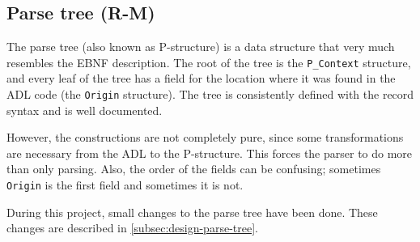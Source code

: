 
\subsection{Parse tree (R-M)}
\label{subsec:analysis-parse-tree}
The parse tree (also known as P-structure) is a data structure that very much resembles the EBNF description.
The root of the tree is the \texttt{P\_Context} structure, and every leaf of the tree has a field for the location where it was found in the ADL code (the \texttt{Origin} structure).
The tree is consistently defined with the record syntax and is well documented.

However, the constructions are not completely pure, since some transformations are necessary from the ADL to the P-structure.
This forces the parser to do more than only parsing.
Also, the order of the fields can be confusing; sometimes \texttt{Origin} is the first field and sometimes it is not.

During this project, small changes to the parse tree have been done.
These changes are described in \autoref{subsec:design-parse-tree}.
